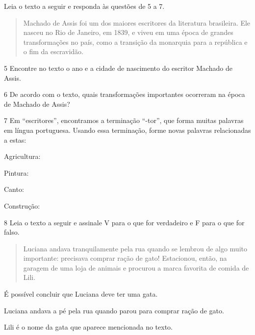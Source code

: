 Leia o texto a seguir e responda às questões de 5 a 7.

\begin{quote}
Machado de Assis foi um dos maiores escritores da literatura
brasileira. Ele nasceu no Rio de Janeiro, em 1839, e viveu em uma época
de grandes transformações no país, como a transição da monarquia para a
república e o fim da escravidão.
\end{quote}

\num{5} Encontre no texto o ano e a cidade de nascimento do escritor Machado de Assis.


\num{6} De acordo com o texto, quais transformações importantes ocorreram na época de Machado de Assis?


\num{7} Em ``escritores'', encontramos a terminação ``-tor'', que forma muitas palavras em língua portuguesa. Usando essa terminação, forme novas palavras relacionadas a estas:

\begin{escolha}
\item Agricultura: \preencher {}

\item Pintura: \preencher {}

\item Canto: \preencher {}

\item Construção: \preencher {}
\end{escolha}

\num{8} Leia o texto a seguir e assinale V para o que for verdadeiro e F para o que for falso.

\begin{quote}
Luciana andava tranquilamente pela rua quando se lembrou de algo muito
importante: precisava comprar ração de gato! Estacionou, então, na
garagem de uma loja de animais e procurou a marca favorita de comida de
Lili.
\end{quote}

\begin{boxlist}
\item É possível concluir que Luciana deve ter uma gata. 

\item Luciana andava a pé pela rua quando parou para comprar ração de gato. 

\item Lili é o nome da gata que aparece mencionada no texto. 
\end{boxlist}

